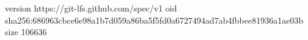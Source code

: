 version https://git-lfs.github.com/spec/v1
oid sha256:686963cbce6e98a1b7d059a86ba5f5fd0a6727494ad7ab4fbbee81936a1ae03b
size 106636
